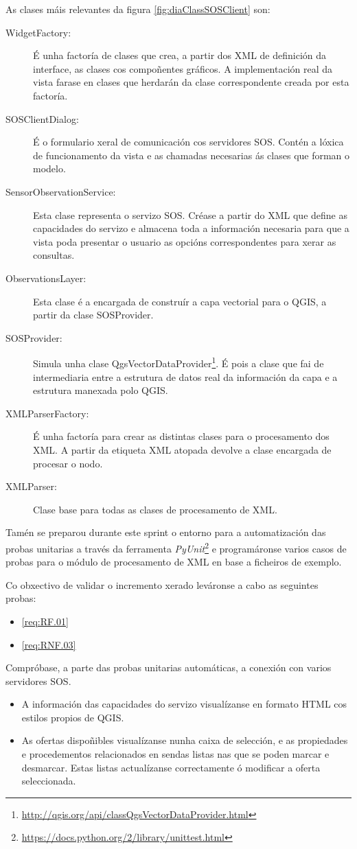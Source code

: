 As clases máis relevantes da figura \ref{fig:diaClassSOSClient} son:
\begin{description}
\item[WidgetFactory:] É unha factoría de clases que crea, a partir dos XML de definición da interface, as clases cos compoñentes gráficos. A implementación real da vista farase en clases que herdarán da clase correspondente creada por esta factoría.
\item[SOSClientDialog:] É o formulario xeral de comunicación cos servidores SOS. Contén a lóxica de funcionamento da vista e as chamadas necesarias ás clases que forman o modelo.
\item[SensorObservationService:] Esta clase representa o servizo SOS. Créase a partir do XML que define as capacidades do servizo e almacena toda a información necesaria para que a vista poda presentar o usuario as opcións correspondentes para xerar as consultas.
\item[ObservationsLayer:] Esta clase é a encargada de construír a capa vectorial para o QGIS, a partir da clase SOSProvider.
\item[SOSProvider:] Simula unha clase QgsVectorDataProvider\footnote{\url{http://qgis.org/api/classQgsVectorDataProvider.html}}. É pois a clase que fai de intermediaria entre a estrutura de datos real da información da capa e a estrutura manexada polo QGIS.
\item[XMLParserFactory:] É unha factoría para crear as distintas clases para o procesamento dos XML. A partir da etiqueta XML atopada devolve a clase encargada de procesar o nodo.
\item[XMLParser:] Clase base para todas as clases de procesamento de XML.
\end{description}

Tamén se preparou durante este sprint o entorno para a automatización das probas unitarias a través da ferramenta \emph{PyUnit}\footnote{\url{https://docs.python.org/2/library/unittest.html}} e programáronse varios casos de probas para o módulo de procesamento de XML en base a ficheiros de exemplo.

Co obxectivo de validar o incremento xerado leváronse a cabo as seguintes probas:

		  {\begin{itemize}\item \ref{req:RF.01} \item \ref{req:RNF.03}\end{itemize}} %
		  {Compróbase, a parte das probas unitarias automáticas, a conexión con varios servidores SOS.} %
		  {\begin{itemize}
		  \item A información das capacidades do servizo visualízanse en formato HTML cos estilos propios de QGIS.
		  \item As ofertas dispoñibles visualízanse nunha caixa de selección, e as propiedades e procedementos relacionados en sendas listas nas que se poden marcar e desmarcar. Estas listas actualízanse correctamente ó modificar a oferta seleccionada.
		  \end{itemize}} %
		  
